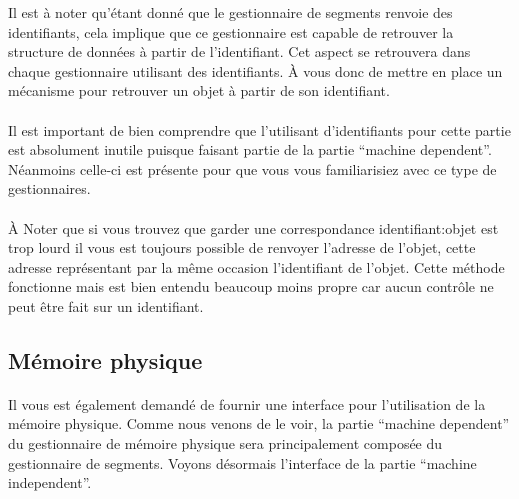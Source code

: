 \documentclass[10pt,a4wide]{article}
\begin{document}
Il est \`a noter qu'\'etant donn\'e que le gestionnaire de segments
renvoie des identifiants, cela implique que ce gestionnaire est capable
de retrouver la structure de donn\'ees \`a partir de l'identifiant. Cet aspect
se retrouvera dans chaque gestionnaire utilisant des identifiants. \`A vous
donc de mettre en place un m\'ecanisme pour retrouver un objet \`a partir
de son identifiant.

\paragraph{}

Il est important de bien comprendre que l'utilisant d'identifiants pour cette
partie est absolument inutile puisque faisant partie de la partie ``machine
dependent''. N\'eanmoins celle-ci est pr\'esente pour que vous vous
familiarisiez avec ce type de gestionnaires.

\paragraph{}

\`A Noter que si vous trouvez que garder une correspondance identifiant:objet
est trop lourd il vous est toujours possible de renvoyer l'adresse de l'objet,
cette adresse repr\'esentant par la m\^eme occasion l'identifiant de l'objet.
Cette m\'ethode fonctionne mais est bien entendu beaucoup moins propre car
aucun contr\^ole ne peut \^etre fait sur un identifiant.

\subsection{M\'emoire physique}

\paragraph{}

Il vous est \'egalement demand\'e de fournir une interface pour
l'utilisation de la m\'emoire physique. Comme nous venons de le voir,
la partie ``machine dependent'' du gestionnaire de m\'emoire physique
sera principalement compos\'ee du gestionnaire de segments. Voyons d\'esormais
l'interface de la partie ``machine independent''.

\paragraph{}
\end{document}
